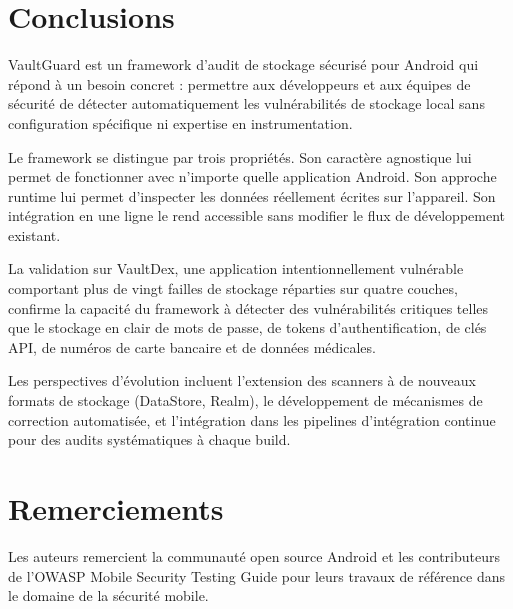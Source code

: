 \documentclass[preprint,12pt, a4paper]{elsarticle}
\begin{document}

\section{Conclusions}

VaultGuard est un framework d'audit de stockage sécurisé pour Android qui répond à un besoin concret : permettre aux développeurs et aux équipes de sécurité de détecter automatiquement les vulnérabilités de stockage local sans configuration spécifique ni expertise en instrumentation.

Le framework se distingue par trois propriétés. Son caractère agnostique lui permet de fonctionner avec n'importe quelle application Android. Son approche runtime lui permet d'inspecter les données réellement écrites sur l'appareil. Son intégration en une ligne le rend accessible sans modifier le flux de développement existant.

La validation sur VaultDex, une application intentionnellement vulnérable comportant plus de vingt failles de stockage réparties sur quatre couches, confirme la capacité du framework à détecter des vulnérabilités critiques telles que le stockage en clair de mots de passe, de tokens d'authentification, de clés API, de numéros de carte bancaire et de données médicales.

Les perspectives d'évolution incluent l'extension des scanners à de nouveaux formats de stockage (DataStore, Realm), le développement de mécanismes de correction automatisée, et l'intégration dans les pipelines d'intégration continue pour des audits systématiques à chaque build.


\section*{Remerciements}
\label{}

Les auteurs remercient la communauté open source Android et les contributeurs de l'OWASP Mobile Security Testing Guide pour leurs travaux de référence dans le domaine de la sécurité mobile.

\end{document}
